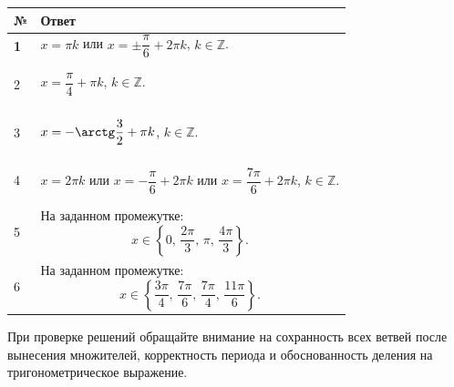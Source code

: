 \documentclass[a4paper,12pt]{article}
\newcommand{\Z}{\mathbb{Z}}
\begin{document}
\begin{table}[ht]
\centering
\begin{tabularx}{\linewidth}{@{}>{\bfseries}p{12mm}X@{}}
\toprule
№ & Ответ \\
\midrule

1 &
$x=\pi k$ или
$x=\pm\dfrac{\pi}{6}+2\pi k$,
$k\in\Z$.
\\

\addlinespace[2mm]

2 &
$x=\dfrac{\pi}{4}+\pi k$,
$k\in\Z$.
\\

\addlinespace[2mm]

3 &
$x=-\arctg\dfrac32+\pi k$,
$k\in\Z$.
\\

\addlinespace[2mm]

4 &
$x=2\pi k$ или
$x=-\dfrac{\pi}{6}+2\pi k$ или
$x=\dfrac{7\pi}{6}+2\pi k$,
$k\in\Z$.
\\

\addlinespace[2mm]

5 &
На заданном промежутке:
\[
x\in
\left\{
0,\,
\dfrac{2\pi}{3},\,
\pi,\,
\dfrac{4\pi}{3}
\right\}.
\]
\\

\addlinespace[2mm]

6 &
На заданном промежутке:
\[
x\in
\left\{
\dfrac{3\pi}{4},\,
\dfrac{7\pi}{6},\,
\dfrac{7\pi}{4},\,
\dfrac{11\pi}{6}
\right\}.
\]
\\

\bottomrule
\end{tabularx}
\end{table}

\vfill

{\small\color{softgray}
При проверке решений обращайте внимание на сохранность всех ветвей
после вынесения множителей, корректность периода и обоснованность
деления на тригонометрическое выражение.}
\end{document}
